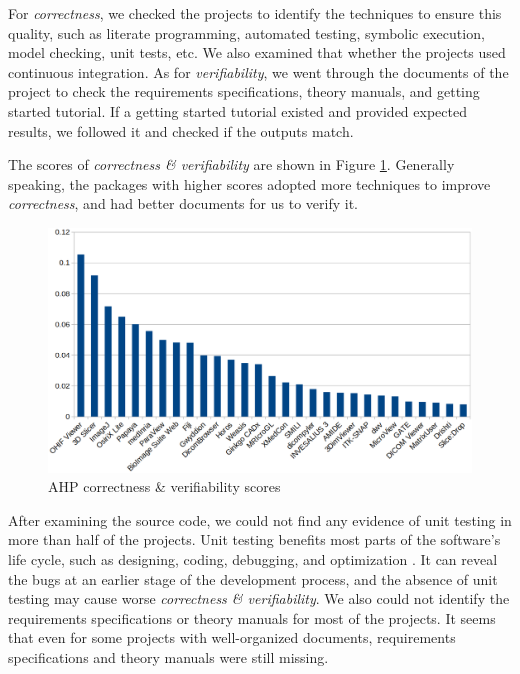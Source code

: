 For \textit{correctness}, we checked the projects to identify the techniques to ensure this quality, such as literate programming, automated testing, symbolic execution, model checking, unit tests, etc. We also examined that whether the projects used continuous integration. As for \textit{verifiability}, we went through the documents of the project to check the requirements specifications, theory manuals, and getting started tutorial. If a getting started tutorial existed and provided expected results, we followed it and checked if the outputs match.

The scores of \textit{correctness \& verifiability} are shown in Figure \ref{fg_correctness_erifiability_scores}. Generally speaking, the packages with higher scores adopted more techniques to improve \textit{correctness}, and had better documents for us to verify it.

\begin{figure}[H]
\includegraphics[scale=0.38]{figures/correctness_verifiability_scores.png}
\caption{AHP correctness \& verifiability scores}
\label{fg_correctness_erifiability_scores}
\end{figure}

After examining the source code, we could not find any evidence of unit testing in more than half of the projects. Unit testing benefits most parts of the software's life cycle, such as designing, coding, debugging, and optimization \cite{Hamill2004}. It can reveal the bugs at an earlier stage of the development process, and the absence of unit testing may cause worse \textit{correctness \& verifiability}. We also could not identify the requirements specifications or theory manuals for most of the projects. It seems that even for some projects with well-organized documents, requirements specifications and theory manuals were still missing.

